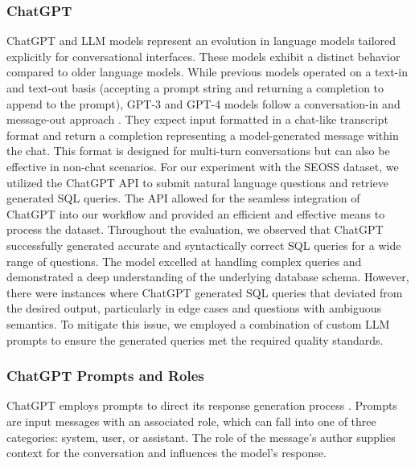 \subsubsection{ChatGPT}

ChatGPT and \ac{LLM} models represent an evolution in language models tailored explicitly for conversational interfaces. These models exhibit a distinct behavior compared to older language models. While previous models operated on a text-in and text-out basis (accepting a prompt string and returning a completion to append to the prompt), GPT-3 and GPT-4 models follow a conversation-in and message-out approach \cite{bubeck2023sparks}. They expect input formatted in a chat-like transcript format and return a completion representing a model-generated message within the chat. This format is designed for multi-turn conversations but can also be effective in non-chat scenarios.
For our experiment with the SEOSS dataset, we utilized the ChatGPT API to submit natural language questions and retrieve generated SQL queries. The API allowed for the seamless integration of ChatGPT into our workflow and provided an efficient and effective means to process the dataset.
Throughout the evaluation, we observed that ChatGPT successfully generated accurate and syntactically correct SQL queries for a wide range of questions. The model excelled at handling complex queries and demonstrated a deep understanding of the underlying database schema.
However, there were instances where ChatGPT generated SQL queries that deviated from the desired output, particularly in edge cases and questions with ambiguous semantics. To mitigate this issue, we employed a combination of custom LLM prompts to ensure the generated queries met the required quality standards.

\subsubsection{ChatGPT Prompts and Roles}

ChatGPT employs prompts to direct its response generation process \cite{white2023prompt}. Prompts are input messages with an associated role, which can fall into one of three categories: system, user, or assistant. The role of the message's author supplies context for the conversation and influences the model's response. \cite{openai2023gpt4}

